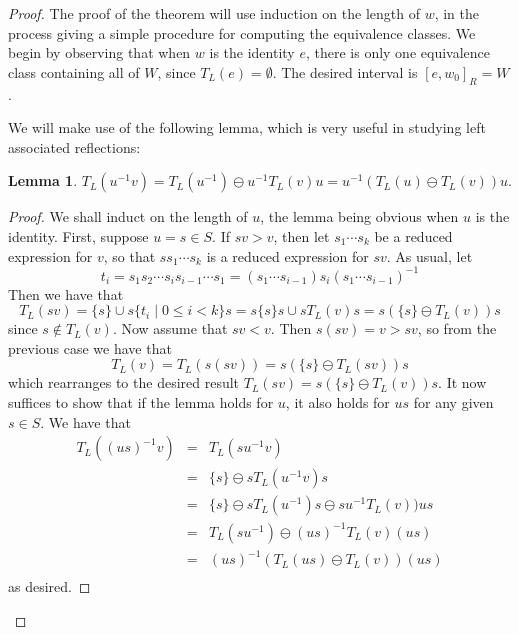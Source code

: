 \documentclass[10pt]{amsart}
\theoremstyle{definition}
\newtheorem{lemma}{Lemma}
\theoremstyle{definition}
\begin{document}
\begin{proof}
The proof of the theorem will use induction on the length of $w$, in the process giving a simple procedure for computing the equivalence classes. We begin by observing that when $w$ is the identity $e$, there is only one equivalence class containing all of $W$, since $T_L(e) = \emptyset$. The desired interval is $[e, w_0]_R = W$.

We will make use of the following lemma, which is very useful in studying left associated reflections:

\begin{lemma}
$T_L(u^{-1}v) = T_L(u^{-1}) \ominus u^{-1}T_L(v)u = u^{-1}(T_L(u) \ominus T_L(v))u$.
\end{lemma}
\begin{proof}
We shall induct on the length of $u$, the lemma being obvious when $u$ is the identity. First, suppose $u = s \in S$. If $sv > v$, then let $s_1\cdots s_k$ be a reduced expression for $v$, so that $ss_1\cdots s_k$ is a reduced expression for $sv$. As usual, let
\[
t_i = s_1s_2\cdots s_is_{i-1}\cdots s_1 = (s_1\cdots s_{i-1}) s_i (s_1\cdots s_{i-1})^{-1}
\]
Then we have that
\[
T_L(sv) = \{s\} \cup s\{t_i \mid 0\leq i < k\}s = s\{s\}s \cup sT_L(v)s = s(\{s\} \ominus T_L(v))s
\]
since $s \notin T_L(v)$. Now assume that $sv < v$. Then $s(sv) = v > sv$, so from the previous case we have that
\[
T_L(v) = T_L(s(sv)) = s(\{s\} \ominus T_L(sv))s
\]
which rearranges to the desired result $T_L(sv) = s(\{s\} \ominus T_L(v))s$. It now suffices to show that if the lemma holds for $u$, it also holds for $us$ for any given $s \in S$. We have that
\[
\begin{array} {lcl}
T_L((us)^{-1}v) &=& T_L(su^{-1}v)\\
&=& \{s\} \ominus sT_L(u^{-1}v)s\\
&=& \{s\} \ominus sT_L(u^{-1})s \ominus su^{-1}T_L(v))us\\
&=& T_L(su^{-1}) \ominus (us)^{-1}T_L(v)(us)\\
&=& (us)^{-1}(T_L(us) \ominus T_L(v))(us)\\
\end{array}
\]
as desired.
\end{proof}


\end{proof}
\end{document}
